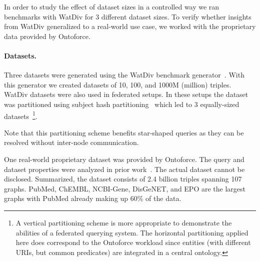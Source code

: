 In order to study the effect of dataset sizes in a controlled way we ran benchmarks with WatDiv for 3 different dataset sizes. To verify
whether insights from WatDiv generalized to a real-world use case, we worked with the proprietary data provided by Ontoforce.

\paragraph{Datasets.} 
Three datasets were generated using the WatDiv benchmark generator~\cite{alucc2014diversified}. 
With this generator we created datasets of 10, 100, and 1000M (million) triples. 
WatDiv datasets were also used in federated setups. 
In these setups the dataset was partitioned using subject hash partitioning~\cite{Zeng, Harth} which led to 3 equally-sized datasets~\footnote{A vertical partitioning scheme is more appropriate to demonstrate the abilities of a federated querying system. The horizontal partitioning applied here does correspond to the Ontoforce workload since entities (with different URIs, but common predicates) are integrated in a central ontology.}.  

Note that this partitioning scheme benefits star-shaped queries as they can be resolved without inter-node communication.

One real-world proprietary dataset was provided by Ontoforce. 
The query and dataset properties were analyzed in prior work~\cite{dewitte_swat4ls_2016}. The actual dataset cannot be disclosed. 
Summarized, the dataset consists of 2.4 billion triples spanning 107 graphs. 
PubMed, ChEMBL, NCBI-Gene, DisGeNET, and EPO are the largest graphs with PubMed already making up 60\% of the data.

